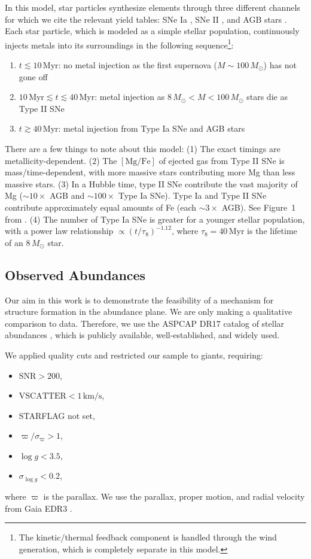 \documentclass[twocolumn,linenumbers,trackchanges]{aastex631}
\newcommand{\Msun}{\ensuremath{M_{\odot}}}
\newcommand{\Myr}{\ensuremath{\textrm{Myr}}}
\newcommand{\kms}{\ensuremath{\textrm{km}/\textrm{s}}}
\newcommand{\MgFe}{\ensuremath{[\textrm{Mg}/\textrm{Fe}]}}
\begin{document}
In this model, star particles synthesize elements through three different channels for which we cite the relevant yield tables: SNe Ia \citep{1997NuPhA.621..467N}, SNe II \citep{1998A&A...334..505P,2006ApJ...653.1145K}, and AGB stars \citep{2010MNRAS.403.1413K,2014MNRAS.437..195D,2014ApJ...797...44F}. Each star particle, which is modeled as a simple stellar population, continuously injects metals into its surroundings in the following sequence\footnote{The kinetic/thermal feedback component is handled through the wind generation, which is completely separate in this model.}:
\begin{enumerate}
    \item $t\lesssim10\,\Myr$: no metal injection as the first supernova ($M\sim100\,\Msun$) has not gone off
    \item $10\,\Myr \lesssim t \lesssim 40\,\Myr$: metal injection as $8\,\Msun<M<100\,\Msun$ stars die as Type II SNe
    \item $t\gtrsim40\,\Myr$: metal injection from Type Ia SNe and AGB stars
\end{enumerate}
There are a few things to note about this model: (1) The exact timings are metallicity-dependent. (2) The \MgFe{} of ejected gas from Type II SNe is mass/time-dependent, with more massive stars contributing more Mg than less massive stars. (3) In a Hubble time, type II SNe contribute the vast majority of Mg ($\sim10\times$ AGB and $\sim100\times$ Type Ia SNe). Type Ia and Type II SNe contribute approximately equal amounts of Fe (each $\sim3\times$ AGB). See Figure~1 from \citet{2018MNRAS.473.4077P}. (4) The number of Type Ia SNe is greater for a younger stellar population, with a power law relationship $\propto \left(t/\tau_8\right)^{-1.12}$, where $\tau_8=40\,\Myr$ is the lifetime of an $8\,\Msun$ star.

\subsection{Observed Abundances}\label{ssec:obs_abund}
Our aim in this work is to demonstrate the feasibility of a mechanism for structure formation in the abundance plane. We are only making a qualitative comparison to data. Therefore, we use the ASPCAP DR17 catalog of stellar abundances \citep[][J.A.~Holtzman et al., in preparation]{2016AJ....151..144G}, which is publicly available, well-established, and widely used.

We applied quality cuts and restricted our sample to giants, requiring:
\begin{itemize}[noitemsep]
    \item $\textrm{SNR} > 200$,
    \item $\textrm{VSCATTER} < 1\,\kms$,
    \item STARFLAG not set,
    \item $\varpi/\sigma_{\varpi} > 1$,
    \item $\log{g} < 3.5$,
    \item $\sigma_{\log{g}} < 0.2$,
\end{itemize}
where $\varpi$ is the parallax. We use the parallax, proper motion, and radial velocity from Gaia EDR3 \citep{2016AA...595A...1G,2021AA...649A...1G,2021AA...649A...2L,2021AA...653A.160S}.
\end{document}
